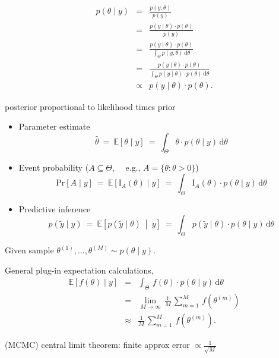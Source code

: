 \documentclass[10pt]{report}
\begin{document}
{\footnotesize
\begin{eqnarray*}
p(\theta \mid y) & = & \frac{p(y, \theta)}{p(y)}
\\[4pt]
& = & \frac{p(y \mid \theta) \cdot p(\theta)}{p(y)}
\\[4pt]
& = & \frac{p(y \mid \theta) \cdot p(\theta)}{\int_{\Theta} p(y, \theta) \, \textrm{d}\theta}
\\[4pt]
& = & \frac{p(y \mid \theta) \cdot p(\theta)}{\int_{\Theta} p(y \mid \theta) \cdot p(\theta) \, \textrm{d}\theta}
\\[10pt]
& \propto &
p(y \mid \theta) \cdot p(\theta).
\end{eqnarray*}
\begin{subitemize}
\item posterior proportional to likelihood times prior
\end{subitemize}
}

\begin{itemize}
\item Parameter estimate
$$
\hat{\theta}
\ = \ \mathbb{E}\!\left[\theta \mid y\right]
\ = \
\int_{\Theta} \theta \cdot p(\theta \mid y) \, \textrm{d}\theta
$$
\item Event probability ($A \subseteq \Theta$, \ \ {\footnotesize e.g., $A = \{ \theta : \theta > 0\}$})
$$
\textrm{Pr}[A \mid y]
\ = \ \mathbb{E}\!\left[\textrm{I}_A(\theta) \mid y\right]
\ = \
\int_{\Theta} \textrm{I}_A(\theta) \cdot p(\theta \mid y)
\, \textrm{d}\theta
$$
\item Predictive inference
$$
p(\tilde{y} \mid y)
\ = \ \mathbb{E}\!\left[p(\tilde{y} \mid \theta) \ \middle| \ y\right]
\ = \
\int_{\Theta} p(\tilde{y} \mid \theta) \cdot p(\theta \mid y)
\, \textrm{d} \theta
$$
\end{itemize}

\begin{subitemize}
\item Given sample $\theta^{(1)}, \ldots, \theta^{(M)} \sim p(\theta \mid y).$
\item General plug-in expectation calculations,
\begin{eqnarray*}
\mathbb{E}[f(\theta) \mid y]
& = &
\int_{\Theta} \, f(\theta) \cdot p(\theta \mid y) \, \textrm{d}\theta
\\[8pt]
& = &
\lim_{M \rightarrow \infty} \,
\frac{1}{M} \, \sum_{m=1}^M \, f\!\left(\theta^{(m)}\right)
\\[8pt]
& \approx &
\frac{1}{M} \, \sum_{m=1}^M \, f\!\left(\theta^{(m)}\right).
\end{eqnarray*}
\item (MCMC) central limit theorem: finite approx error $\propto \frac{\displaystyle 1}{\displaystyle \sqrt{M}}$
\end{subitemize}
\end{document}
